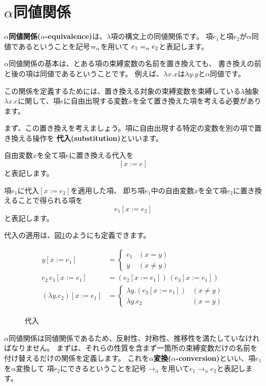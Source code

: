 \section{$\alpha$同値関係}

\textbf{$\alpha$同値関係($\alpha$-equivalence)}は、$\lambda$項の構文上の同値関係です。
項$e_1$と項$e_2$が$\alpha$同値であるということを記号$=_\alpha$を用いて
$e_1 =_\alpha e_2$と表記します。

$\alpha$同値関係の基本は、とある項の束縛変数の名前を置き換えても、
書き換えの前と後の項は同値であるということです。
例えば、$\lambda x . x$は$\lambda y . y$と$\alpha$同値です。

この関係を定義するためには、置き換える対象の束縛変数を束縛している$\lambda$抽象
$\lambda x . e$に関して、項$e$に自由出現する変数$x$を全て置き換えた項を考える必要があります。

まず、この置き換えを考えましょう。項に自由出現する特定の変数を別の項で置き換える操作を
\textbf{代入(substitution)}といいます。

自由変数$x$を全て項$e$に置き換える代入を
\[
  [x := e]
\]
と表記します。

項$e_1$に代入$[x := e_2]$を適用した項、
即ち項$e_1$中の自由変数$x$を全て項$e_2$に置き換えることで得られる項を
\[
  e_1 [x := e_2]
\]
と表記します。

代入の適用は、図\ref{fig:lambda-substitute}のようにも定義できます。

\begin{figure}[htbp]
  \begin{align*}
    y [x := e_1] & = \left \{
      \begin{array}{ll}
        e_1 & (x = y) \\
        y & (x \neq y)
      \end{array}
      \right. \\
    e_2 \, e_3 [x := e_1] & = (e_2 [x := e_1]) \, (e_3 [x := e_1]) \\
    (\lambda y . e_2) [x := e_1] & = \left \{
      \begin{array}{ll}
        \lambda y . (e_2 [x := e_1]) & (x \neq y) \\
        \lambda y . e_2 & (x = y)
      \end{array}
      \right.
  \end{align*}
  \caption{代入}
  \label{fig:lambda-substitute}
\end{figure}

$\alpha$同値関係は同値関係であるため、反射性、対称性、推移性を満たしていなければなりません。
まずは、それらの性質を含まず一箇所の束縛変数だけの名前を付け替えるだけの関係を定義します。
これを\textbf{$\alpha$変換($\alpha$-conversion)}といい、項$e_1$を$\alpha$変換して
項$e_2$にできるということを記号$\to_\alpha$を用いて$e_1 \to_\alpha e_2$と表記します。

